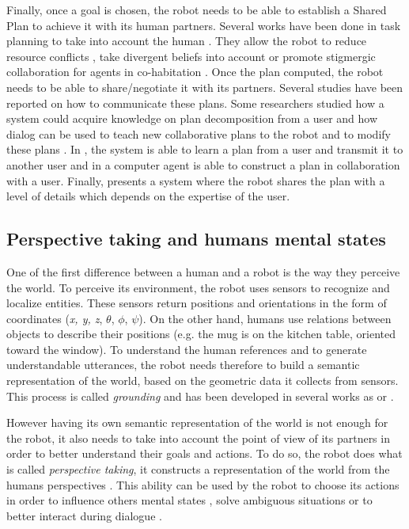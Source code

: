 \documentclass[english,a4paper,11pt,twoside]{StyleThese}
\begin{document}
Finally, once a goal is chosen, the robot needs to be able to establish a Shared Plan to achieve it with its human partners. Several works have been done in task planning to take into account the human \cite{cirillo2010human,Lallement2014hatp}. They allow the robot to reduce resource conflicts \cite{chakraborti2016planning}, take divergent beliefs into account \cite{guitton2012belief,talamadupula2014coordination} or promote stigmergic collaboration
for agents in co-habitation \cite{chakraborti2015planning}. 
Once the plan computed, the robot needs to be able to share/negotiate it with its partners. Several studies have been reported on how to communicate these plans. Some researchers studied how a system could acquire knowledge on plan decomposition from a user \cite{Mohseni2015} and how dialog can be used to teach new collaborative plans to the robot and to modify these plans \cite{petit2013coordinating}. In \cite{sorce2015proof}, the system is able to learn a plan from a user and transmit it to another user and in \cite{allen2002human} a computer agent is able to construct a plan in collaboration with a user. Finally, \cite{milliez2016using} presents a system where the robot shares the plan with a level of details which depends on the expertise of the user.

\subsection{Perspective taking and humans mental states}

\label{subsec:perspective_taking}

One of the first difference between a human and a robot is the way they perceive the world. To perceive its environment, the robot uses sensors to recognize and localize entities. These sensors return positions and orientations in the form of coordinates (\textit{x, y, z}, $\theta$, $\phi$, $\psi$). On the other hand, humans use relations between objects to describe their positions (e.g. the mug is on the kitchen table, oriented toward the window). To understand the human references and to
generate understandable utterances, the robot needs therefore
to build a semantic representation of the world, based on the
geometric data it collects from sensors. This process is called \textit{grounding} and has been developed in several works as \cite{mavridis2005grounded} or \cite{lemaignan2012grounding}.

However having its own semantic representation of the world is not enough for the robot, it also needs to take into account the point of view of its partners in order to better understand their goals and actions. To do so, the robot does what is called \textit{perspective taking}, it constructs a representation of the world from the humans perspectives \cite{breazeal2006using,milliez2014framework}. This ability can be used by the robot to choose its actions in order to influence others mental states \cite{gray2014manipulating}, solve ambiguous situations \cite{ros2010one} or to better interact during dialogue \cite{ferreira2015users}.
\end{document}
